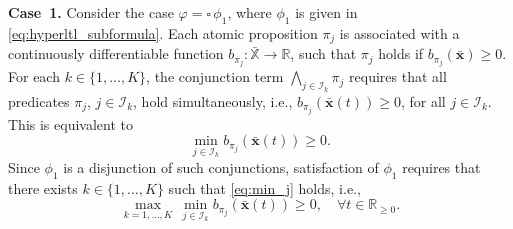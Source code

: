 \documentclass[letterpaper, 10 pt, conference]{ieeeconf}  %
\begin{document}
\textbf{Case~1.} Consider the case $\varphi = \square \, \phi_1$, where $\phi_1$ is given in \eqref{eq:hyperltl_subformula}. Each atomic proposition $\pi_j$ is associated with a continuously differentiable function $b_{\pi_j} : \bar{\mathbb{X}} \to \mathbb{R}$, such that $\pi_j$ holds if $b_{\pi_j}(\bar{\mathbf{x}}) \ge 0$. For each $k \in \{1, \dots, K\}$, the conjunction term $\bigwedge_{j \in \mathcal{I}_k} \pi_j$ requires that all predicates $\pi_j$, $j \in \mathcal{I}_k$, hold simultaneously, i.e., $b_{\pi_j}(\bar{\mathbf{x}}(t)) \ge 0$, for all $j \in \mathcal{I}_k$. This is equivalent to
\begin{equation} \label{eq:min_j}
    \min_{j \in \mathcal{I}_k} b_{\pi_j}(\bar{\mathbf{x}}(t)) \ge 0.
\end{equation}
Since $\phi_1$ is a disjunction of such conjunctions, satisfaction of $\phi_1$ requires that there exists $k \in \{1, \dots, K\}$ such that \eqref{eq:min_j} holds, i.e.,
\[
    \max_{k=1,\dots,K} \, \min_{j \in \mathcal{I}_k} b_{\pi_j}(\bar{\mathbf{x}}(t)) \ge 0, \quad \forall t \in \mathbb{R}_{\ge 0}.
\]
\end{document}
